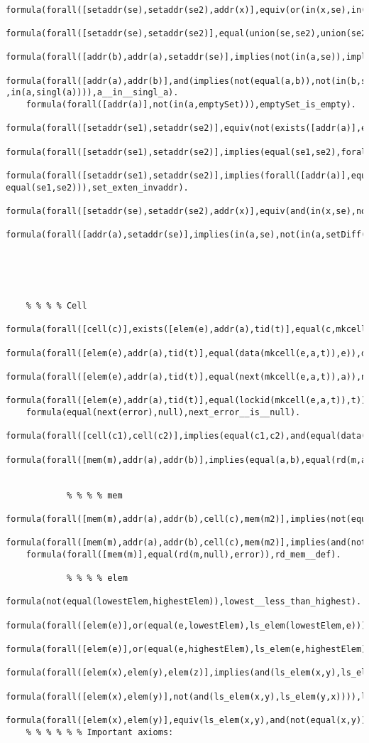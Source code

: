 \begin{lstlisting}
    formula(forall([setaddr(se),setaddr(se2),addr(x)],equiv(or(in(x,se),in(x,se2)),in(x,union(se,se2)))),union_def).
    formula(forall([setaddr(se),setaddr(se2)],equal(union(se,se2),union(se2,se))),union_conmutative).
    formula(forall([addr(b),addr(a),setaddr(se)],implies(not(in(a,se)),implies(in(b,se),not(equal(b,a))))),in_set__def).
    formula(forall([addr(a),addr(b)],and(implies(not(equal(a,b)),not(in(b,singl(a)))) ,in(a,singl(a)))),a__in__singl_a).
    formula(forall([addr(a)],not(in(a,emptySet))),emptySet_is_empty).
    formula(forall([setaddr(se1),setaddr(se2)],equiv(not(exists([addr(a)],equiv(in(a,se1),not(in(a,se2))))),equal(se1,se2))),set_eq_addr).
    formula(forall([setaddr(se1),setaddr(se2)],implies(equal(se1,se2),forall([addr(a)],equiv(in(a,se1),in(a,se2))))),set_extenaddr).
    formula(forall([setaddr(se1),setaddr(se2)],implies(forall([addr(a)],equiv(in(a,se1),in(a,se2))),    equal(se1,se2))),set_exten_invaddr).
    formula(forall([setaddr(se),setaddr(se2),addr(x)],equiv(and(in(x,se),not(in(x,se2))),in(x,setDiff(se,se2)))),SetDiff_def).
    formula(forall([addr(a),setaddr(se)],implies(in(a,se),not(in(a,setDiff(se,singl(a)))))),a_not__in_se_dif_a).





    % % % % Cell
    formula(forall([cell(c)],exists([elem(e),addr(a),tid(t)],equal(c,mkcell(e,a,t)))),mckcell__def_tllign).
    formula(forall([elem(e),addr(a),tid(t)],equal(data(mkcell(e,a,t)),e)),data__def).
    formula(forall([elem(e),addr(a),tid(t)],equal(next(mkcell(e,a,t)),a)),next__def).
    formula(forall([elem(e),addr(a),tid(t)],equal(lockid(mkcell(e,a,t)),t)),lockid__def).
    formula(equal(next(error),null),next_error__is__null).
    formula(forall([cell(c1),cell(c2)],implies(equal(c1,c2),and(equal(data(c1),data(c2)),equal(lockid(c1),lockid(c2)),equal(next(c1),next(c2))))),equality_bt_cell).
    formula(forall([mem(m),addr(a),addr(b)],implies(equal(a,b),equal(rd(m,a),rd(m,b)))),equality_on_read).


            % % % % mem
    formula(forall([mem(m),addr(a),addr(b),cell(c),mem(m2)],implies(not(equal(a,null)),implies(equal(upd(m,a,c),m2),equal(rd(m2,a),c)))),upd__def__not_null).
    formula(forall([mem(m),addr(a),addr(b),cell(c),mem(m2)],implies(and(not(equal(a,null)),not(equal(a,b))),implies(equal(upd(m,a,c),m2),equal(rd(m,b),rd(m2,b))))),upd__def__one_at_the_time).
    formula(forall([mem(m)],equal(rd(m,null),error)),rd_mem__def).

            % % % % elem
    formula(not(equal(lowestElem,highestElem)),lowest__less_than_highest).
    formula(forall([elem(e)],or(equal(e,lowestElem),ls_elem(lowestElem,e))),lowestElem__def_tll).
    formula(forall([elem(e)],or(equal(e,highestElem),ls_elem(e,highestElem))),highestElem__def_tll).
    formula(forall([elem(x),elem(y),elem(z)],implies(and(ls_elem(x,y),ls_elem(y,z)),ls_elem(x,z))),less_trans).
    formula(forall([elem(x),elem(y)],not(and(ls_elem(x,y),ls_elem(y,x)))),less_total).
    formula(forall([elem(x),elem(y)],equiv(ls_elem(x,y),and(not(equal(x,y)),not(ls_elem(y,x))))),ls_xy__not_ls_yx).
    % % % % % % Important axioms: 


\end{lstlisting}
